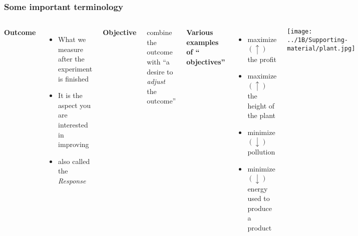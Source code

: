\documentclass[11pt,aspectratio=169,mathserif]{beamer}
\begin{document}
\begin{frame}\frametitle{Some important terminology}

	\begin{columns}[T]
			\textbf{{\color{purple} Outcome}}
				\begin{itemize}
					\item	What we measure after the experiment is finished  \pause
					\item	It is the aspect you are interested in improving  
					\item	also called the \emph{Response}

				\end{itemize}
			
			\pause
			\vspace{12pt}	
			\textbf{{\color{purple} Objective}}
			
				\vspace{1pt}	
				\qquad combine the {\color{purple} outcome} with ``a desire to \emph{adjust} the outcome''
				
				
			\pause
			\vspace{12pt}
			
			{\textbf{{Various examples of ``{\color{purple} objectives}''}}}

				\begin{itemize}
					\item	maximize $(\uparrow)$ the profit
					\item	maximize $(\uparrow)$ the height of the plant
					\item	minimize $(\downarrow)$ pollution
					\item	minimize $(\downarrow)$ energy used to produce a product
				\end{itemize}
			
			
			\centerline{\texttt{[image: ../1B/Supporting-material/plant.jpg]}}
	\end{columns}


\end{frame}
\end{document}
